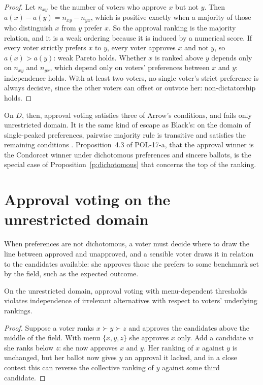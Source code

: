 \documentclass{situationist-preprint}
\begin{document}
\begin{proof}
Let $n_{xy}$ be the number of voters who approve $x$ but not $y$. Then $a(x) - a(y) = n_{xy} - n_{yx}$, which is positive exactly when a majority of those who distinguish $x$ from $y$ prefer $x$. So the approval ranking is the majority relation, and it is a weak ordering because it is induced by a numerical score. If every voter strictly prefers $x$ to $y$, every voter approves $x$ and not $y$, so $a(x) > a(y)$: weak Pareto holds. Whether $x$ is ranked above $y$ depends only on $n_{xy}$ and $n_{yx}$, which depend only on voters' preferences between $x$ and $y$: independence holds. With at least two voters, no single voter's strict preference is always decisive, since the other voters can offset or outvote her: non-dictatorship holds.
\end{proof}

On $D$, then, approval voting satisfies three of Arrow's conditions, and fails only unrestricted domain. It is the same kind of escape as Black's: on the domain of single-peaked preferences, pairwise majority rule is transitive and satisfies the remaining conditions \citep{Black1948}. Proposition~4.3 of POL-17-a, that the approval winner is the Condorcet winner under dichotomous preferences and sincere ballots, is the special case of Proposition~\ref{p:dichotomous} that concerns the top of the ranking.

\section{Approval voting on the unrestricted domain}

When preferences are not dichotomous, a voter must decide where to draw the line between approved and unapproved, and a sensible voter draws it in relation to the candidates available: she approves those she prefers to some benchmark set by the field, such as the expected outcome.

\begin{proposition}\label{p:iia}
On the unrestricted domain, approval voting with menu-dependent thresholds violates independence of irrelevant alternatives with respect to voters' underlying rankings.
\end{proposition}

\begin{proof}
Suppose a voter ranks $x \succ y \succ z$ and approves the candidates above the middle of the field. With menu $\{x, y, z\}$ she approves $x$ only. Add a candidate $w$ she ranks below $z$: she now approves $x$ and $y$. Her ranking of $x$ against $y$ is unchanged, but her ballot now gives $y$ an approval it lacked, and in a close contest this can reverse the collective ranking of $y$ against some third candidate.
\end{proof}
\end{document}
